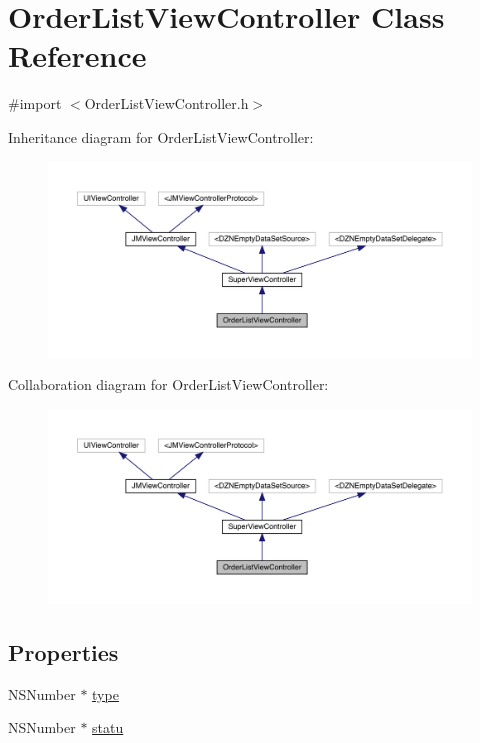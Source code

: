 \hypertarget{interface_order_list_view_controller}{}\section{Order\+List\+View\+Controller Class Reference}
\label{interface_order_list_view_controller}


{\ttfamily \#import $<$Order\+List\+View\+Controller.\+h$>$}



Inheritance diagram for Order\+List\+View\+Controller\+:\nopagebreak
\begin{figure}[H]
\begin{center}
\leavevmode
\includegraphics[width=350pt]{interface_order_list_view_controller__inherit__graph}
\end{center}
\end{figure}


Collaboration diagram for Order\+List\+View\+Controller\+:\nopagebreak
\begin{figure}[H]
\begin{center}
\leavevmode
\includegraphics[width=350pt]{interface_order_list_view_controller__coll__graph}
\end{center}
\end{figure}
\subsection*{Properties}
\begin{DoxyCompactItemize}
\item 
N\+S\+Number $\ast$ \mbox{\hyperlink{interface_order_list_view_controller_a40adcf2260d1819b4de7c2919c04685a}{type}}
\item 
N\+S\+Number $\ast$ \mbox{\hyperlink{interface_order_list_view_controller_a129a65a182c09c55bbe60047ddb27eb9}{statu}}
\end{DoxyCompactItemize}
